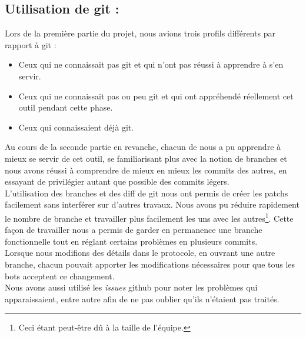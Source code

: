 \documentclass[a4paper,12pt]{article}
\begin{document}
\subsection{Utilisation de git :}
Lors de la première partie du projet, nous avions trois profils différents par
rapport à git :
\begin{itemize}
\item Ceux qui ne connaissait pas git et qui n'ont pas réussi à apprendre à s'en
  servir.
\item Ceux qui ne connaissait pas ou peu git et qui ont appréhendé réellement
  cet outil pendant cette phase.
\item Ceux qui connaissaient déjà git.
\end{itemize}
Au cours de la seconde partie en revanche, chacun de nous a pu apprendre à mieux
se servir de cet outil, se familiarisant plus avec la notion de branches et nous
avons réussi à comprendre de mieux en mieux les commits des autres, en essayant
de privilégier autant que possible des commits légers.
\\
L'utilisation des branches et des diff de git nous ont permis de créer les
patchs facilement sans interférer sur d'autres travaux. Nous avons pu réduire
rapidement le nombre de branche et travailler plus facilement les uns avec les
autres\footnote{Ceci étant peut-être dû à la taille de l'équipe.}. Cette façon
de travailler nous a permis de garder en permanence une branche fonctionnelle
tout en réglant certains problèmes en plusieurs commits.
\\
Lorsque nous modifions des détails dans le protocole, en ouvrant une autre
branche, chacun pouvait apporter les modifications nécessaires pour que tous les
bots acceptent ce changement.
\\
Nous avons aussi utilisé les {\em issues} github pour noter les problèmes qui
apparaissaient, entre autre afin de ne pas oublier qu'ils n'étaient pas traités.
\end{document}

